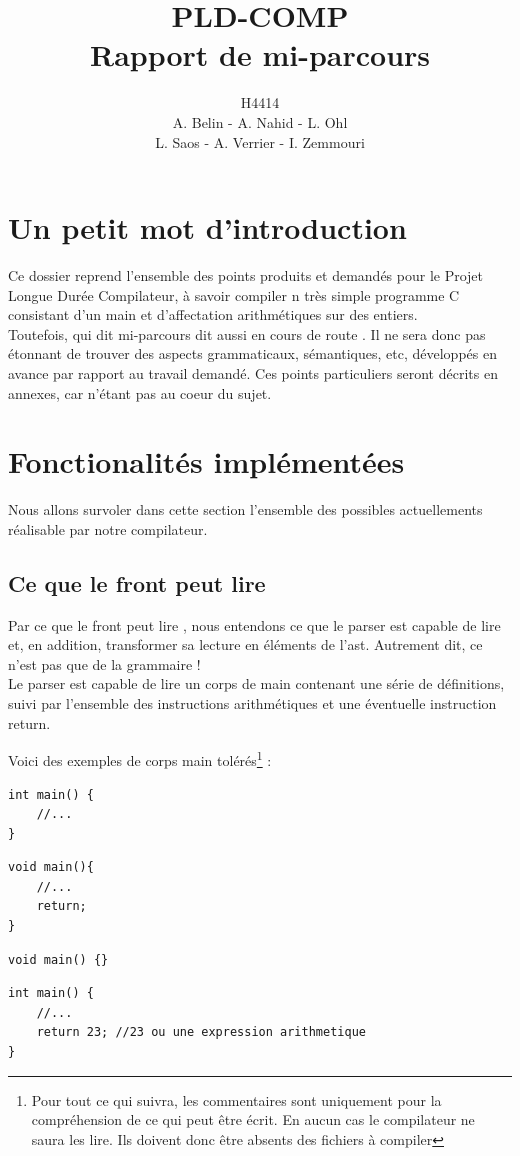 \documentclass{report}
\title{PLD-COMP\\Rapport de mi-parcours}
\author{H4414\\A. Belin - A. Nahid - L. Ohl\\L. Saos - A. Verrier - I. Zemmouri}
\begin{document}
\maketitle
\tableofcontents
\section*{Un petit mot d'introduction}

Ce dossier reprend l'ensemble des points produits et demandés pour le Projet Longue Durée Compilateur, à savoir compiler n très simple programme C consistant d'un main et d'affectation arithmétiques sur des entiers.\\
Toutefois, qui dit mi-parcours dit aussi \og en cours de route \fg. Il ne sera donc pas étonnant de trouver des aspects grammaticaux, sémantiques, etc, développés en avance par rapport au travail demandé. Ces points particuliers seront décrits en annexes, car n'étant pas au coeur du sujet.

\section{Fonctionalités implémentées}
\label{sec:Fonc}

Nous allons survoler dans cette section l'ensemble des possibles actuellements réalisable par notre compilateur.

\subsection{Ce que le front peut lire}
\label{subsec:Front}

Par \og ce que le front peut lire \fg, nous entendons ce que le parser est capable de lire et, en addition, transformer sa lecture en éléments de l'ast. Autrement dit, ce n'est pas que de la grammaire !\\

Le parser est capable de lire un corps de main contenant une série de définitions, suivi par l'ensemble des instructions arithmétiques et une éventuelle instruction return.

Voici des exemples de corps main tolérés\footnote{Pour tout ce qui suivra, les commentaires sont uniquement pour la compréhension de ce qui peut être écrit. En aucun cas le compilateur ne saura les lire. Ils doivent donc être absents des fichiers à compiler} :
\begin{lstlisting}
int main() {
	//...
}
\end{lstlisting}
\begin{lstlisting}
void main(){
	//...
	return;
}
\end{lstlisting}
\begin{lstlisting}
void main() {}
\end{lstlisting}
\begin{lstlisting}
int main() {
	//...
	return 23; //23 ou une expression arithmetique
}
\end{lstlisting}
\end{document}
